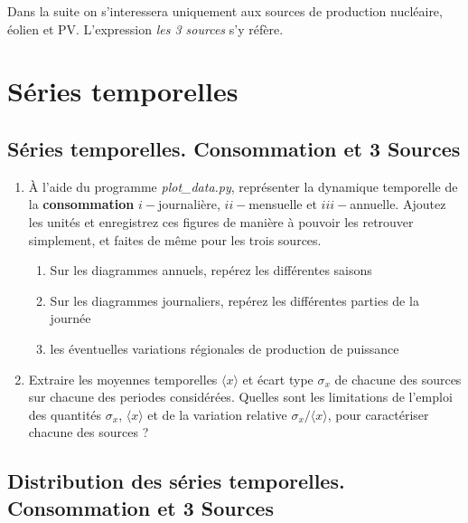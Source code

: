 \documentclass[12pt,a4]{article}
\newcommand{\tmtextbf}[1]{{\bfseries{#1}}}
\newcommand{\tmtextit}[1]{{\itshape{#1}}}
\begin{document}
Dans la suite on s'interessera uniquement aux sources de production
nucléaire, éolien et PV. L'expression \tmtextit{les 3 sources} s'y
réfère.


\section{Séries temporelles}


\subsection{Séries temporelles. Consommation et 3 Sources}

\begin{enumerate}
  \item À l'aide du programme \tmtextit{plot\_data.py}, représenter la
  dynamique temporelle de la \tmtextbf{consommation} $i-$journalière, $ii-$mensuelle
  et $iii-$annuelle. Ajoutez les unités et enregistrez ces figures de manière à
  pouvoir les retrouver simplement, et faites de même pour les trois sources.
 
  \begin{enumerate}
    \item Sur les diagrammes annuels, repérez les différentes saisons
    
    \item Sur les diagrammes journaliers, repérez les différentes parties de
    la journée
    
    \item les éventuelles variations régionales de production de puissance
  \end{enumerate}
  \item Extraire les moyennes temporelles $\langle x \rangle$ et écart type
  $\sigma_x$ de chacune des sources sur chacune des periodes considérées.
  Quelles sont les limitations de l'emploi des quantités $\sigma_x $, $ \langle
  x \rangle$ et de la variation relative $\sigma_x / \langle
  x \rangle$, pour caractériser chacune des sources ?
\end{enumerate}

\subsection{Distribution des séries temporelles. Consommation et 3 Sources}
\end{document}
